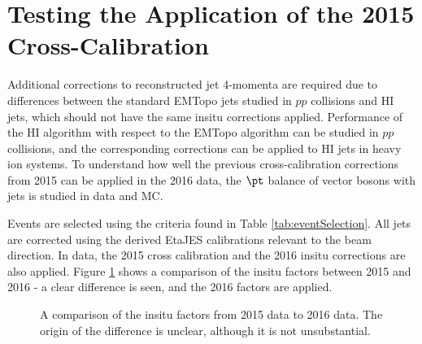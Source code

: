 \documentclass[NOTE, atlasdraft=true, texlive=2016, USenglish]{\ATLASLATEXPATH atlasdoc}
\begin{document}
\section{Testing the Application of the 2015 Cross-Calibration}
\label{sec:EtaJES}

Additional corrections to reconstructed jet 4-momenta are required due to differences between the standard EMTopo jets studied in $pp$ collisions and HI jets, which should not have the same insitu corrections applied. Performance of the HI algorithm with respect to the EMTopo algorithm can be studied in $pp$ collisions, and the corresponding corrections can be applied to HI jets in heavy ion systems. To understand how well the previous cross-calibration corrections from 2015 can be applied in the 2016 data, the $\pt$ balance of vector bosons with jets is studied in data and MC.\par
Events are selected using the criteria found in Table \ref{tab:eventSelection}. All jets are corrected using the derived EtaJES calibrations relevant to the beam direction. In data, the 2015 cross calibration and the 2016 insitu corrections are also applied. Figure \ref{fig:insituComp} shows a comparison of the insitu factors between 2015 and 2016 - a clear difference is seen, and the 2016 factors are applied.
\begin{figure}[htbp]
	\centering
	\caption{A comparison of the insitu factors from 2015 data to 2016 data. The origin of the difference is unclear, although it is not unsubstantial.}
	\label{fig:insituComp}
\end{figure}
\end{document}
